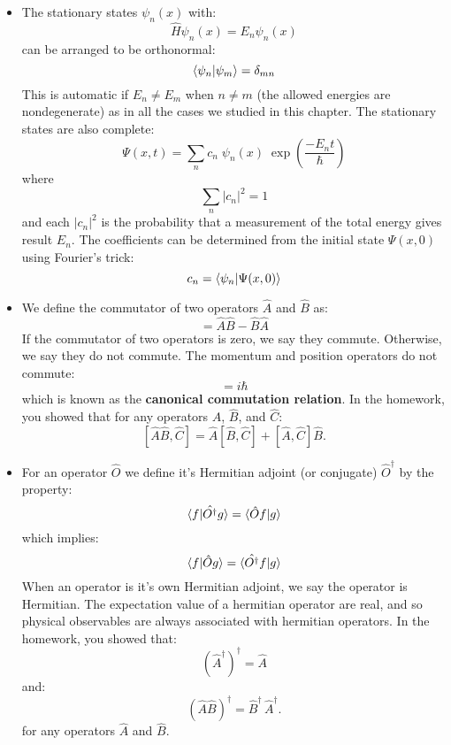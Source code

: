 \documentclass[12pt]{article}
\begin{document}
\begin{itemize}
\item The stationary states $\psi_n(x)$ with:
$$\hat{H} \psi_n(x) = E_n \psi_n(x)$$
can be arranged to be orthonormal:
\begin{equation}
\braket{\psi_n|\psi_m}=\delta_{mn}
\end{equation}
This is automatic if $E_n \neq E_m$ when $n \neq m$ (the allowed energies are nondegenerate) as in all the cases we studied in this chapter.  The stationary states are also complete:
\begin{equation}
\Psi(x,t) = \sum_n c_n \; \psi_n(x) \; \exp\left(\frac{-E_n t}{\hbar}\right)
\end{equation}
where 
$$\sum_n |c_n|^2 = 1$$
and each $|c_n|^2$ is the probability that a measurement of the total energy gives result $E_n$.  The coefficients can be determined from the initial state $\Psi(x,0)$ using Fourier's trick:
\begin{equation}
c_n = \braket{\psi_n| \Psi(x,0)}
\end{equation}
\item We define the commutator of two operators $\hat{A}$ and $\hat{B}$ as:
\begin{equation}
[\hat{A},\hat{B}]=\hat{A}\hat{B} - \hat{B}\hat{A}
\end{equation}
If the commutator of two operators is zero, we say they commute.  Otherwise, we say they do not commute.  The momentum and position operators do not commute:
\begin{equation}
[\hat{x},\hat{p}]=i\hbar
\end{equation}
which is known as the {\bf canonical commutation relation}.  In the homework, you showed that
for any operators $\hat{A}$, $\hat{B}$, and $\hat{C}$:
$$ [\hat{A}\hat{B}, \hat{C}] = \hat{A}[\hat{B}, \hat{C}] + [\hat{A}, \hat{C}]\hat{B}.$$

\item For an operator $\hat{O}$ we define it's Hermitian adjoint (or conjugate) $\hat{O}^\dagger$ by the property:
\begin{equation}
\braket{f|\hat{O^\dagger}g} = \braket{\hat{O} f| g}
\end{equation}
which implies:
\begin{equation}
\braket{f|\hat{O}g} = \braket{\hat{O^\dagger} f| g}
\end{equation}
When an operator is it's own Hermitian adjoint, we say the operator is Hermitian.  The expectation value of a hermitian operator are real, and so physical observables are always associated with hermitian operators.  In the homework, you showed that:
$$\left(\hat{A}^\dagger\right)^\dagger = \hat{A}$$
and:
$$\left(\hat{A}\hat{B}\right)^\dagger = \hat{B}^\dagger \, \hat{A}^\dagger.$$
for any operators $\hat{A}$ and $\hat{B}$.


\end{itemize}
\end{document}
